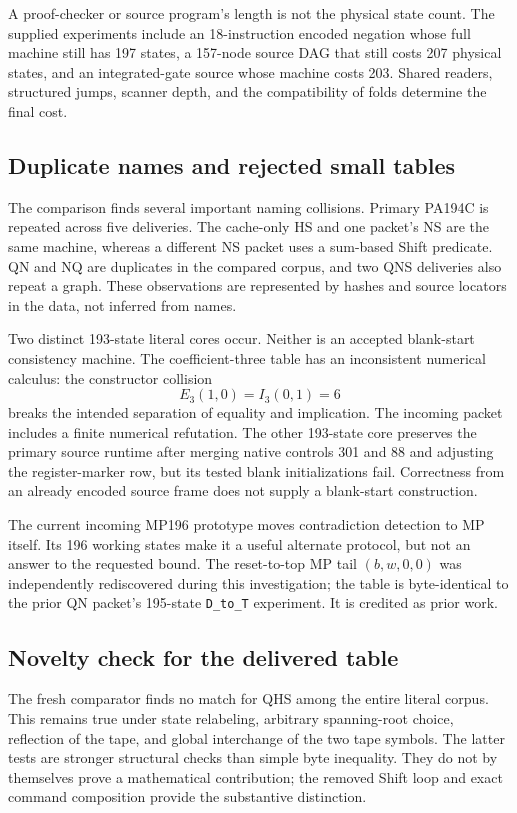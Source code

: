\documentclass[11pt,letterpaper]{article}
\newcommand{\file}[1]{\texttt{\nolinkurl{#1}}}
\begin{document}
A proof-checker or source program's length is not the physical state
count. The supplied experiments include an 18-instruction encoded
negation whose full machine still has 197 states, a 157-node source DAG
that still costs 207 physical states, and an integrated-gate source
whose machine costs 203. Shared readers, structured jumps, scanner depth,
and the compatibility of folds determine the final cost.

\subsection{Duplicate names and rejected small tables}

The comparison finds several important naming collisions. Primary
PA194C is repeated across five deliveries. The cache-only HS and one
packet's NS are the same machine, whereas a different NS packet uses a
sum-based Shift predicate. QN and NQ are duplicates in the compared
corpus, and two QNS deliveries also repeat a graph. These observations
are represented by hashes and source locators in the data, not inferred
from names.

Two distinct 193-state literal cores occur. Neither is an accepted
blank-start consistency machine. The coefficient-three table has an
inconsistent numerical calculus: the constructor collision
\[
 E_3(1,0)=I_3(0,1)=6
\]
breaks the intended separation of equality and implication. The incoming
packet includes a finite numerical refutation. The other 193-state core
preserves the primary source runtime after merging native controls 301
and 88 and adjusting the register-marker row, but its tested blank
initializations fail. Correctness from an already encoded source frame
does not supply a blank-start construction.

The current incoming MP196 prototype moves contradiction detection to
MP itself. Its 196 working states make it a useful alternate protocol,
but not an answer to the requested bound. The reset-to-top MP tail
$(b,w,0,0)$ was independently rediscovered during this investigation;
the table is byte-identical to the prior QN packet's 195-state
\file{D_to_T} experiment. It is credited as prior work.

\subsection{Novelty check for the delivered table}

The fresh comparator finds no match for QHS among the entire literal
corpus. This remains true under state relabeling, arbitrary spanning-root
choice, reflection of the tape, and global interchange of the two tape
symbols. The latter tests are stronger structural checks than simple
byte inequality. They do not by themselves prove a mathematical
contribution; the removed Shift loop and exact command composition
provide the substantive distinction.
\end{document}
